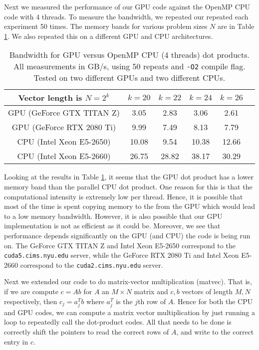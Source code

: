 \documentclass[10pt]{article}
\begin{document}
\begin{enumerate}
Next we measured the performance of our GPU code against the OpenMP CPU code with 4 threads. To measure the bandwidth, we repeated our repeated each experiment 50 times. The memory bands for various problem sizes $N$ are in Table \ref{vecvec}. We also repeated this on a different GPU and CPU architectures.
\begin{table}[!ht]
\centering
\caption{Bandwidth for GPU versus  OpenMP CPU (4 threads) dot products. All measurements in GB/s, using 50 repeats and \texttt{-O2} compile flag. Tested on two different GPUs and two different CPUs.}
\begin{tabular}{| c | c | c | c | c | c |}
\hline
Vector length is $N=2^{k}$ & $k=20$ & $k=22$  & $k=24$ & $k=26$  \\
\hline
GPU (GeForce GTX TITAN Z) & 3.05 & 2.83 & 3.06 & 2.61  \\
GPU (GeForce RTX 2080 Ti) & 9.99 & 7.49 & 8.13 & 7.79  \\
CPU (Intel Xeon E5-2650) & 10.08 & 9.54 & 10.38 & 12.66 \\
CPU (Intel Xeon E5-2660) & 26.75 & 28.82 & 38.17 & 30.29 \\
\hline
\end{tabular}
\label{vecvec}
\end{table}

Looking at the results in Table \ref{vecvec}, it seems that the GPU dot product has a lower memory band than the parallel CPU dot product. One reason for this is that the computational intensity is extremely low per thread. Hence, it is possible that most of the time is spent copying memory to the from the GPU which would lead to a low memory bandwidth. However, it is also possible that our GPU implementation is not as efficient as it could be. Moreover, we see that performance depends significantly on the GPU (and CPU) the code is being run on. The GeForce GTX TITAN Z and Intel Xeon E5-2650 correspond to the \texttt{cuda5.cims.nyu.edu} server, while the GeForce RTX 2080 Ti and Intel Xeon E5-2660 correspond to the \texttt{cuda2.cims.nyu.edu} server.

Next we extended our code to do matrix-vector multiplication (matvec). That is, if we are compute $c = Ab$ for $A$ an $M \times N$ matrix and $c,b$ vectors of length $M,N$ respectively, then $c_{j} = a_{j}^{T}b$ where $a_{j}^{T}$ is the $j$th row of $A$. Hence for both the CPU and GPU codes, we can compute a matrix vector multiplication by just running a loop to repeatedly call the dot-product codes. All that needs to be done is correctly shift the pointers to read the correct rows of $A$, and write to the correct entry in $c$. 


\end{enumerate}
\end{document}
